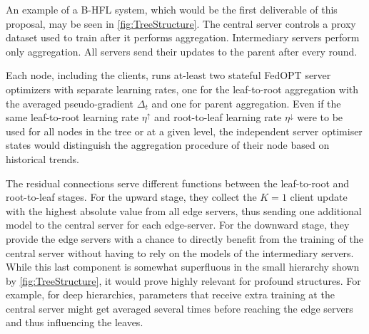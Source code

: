 An example of a B-HFL system, which would be the first deliverable of this proposal, may be seen in \cref{fig:TreeStructure}. The central server controls a proxy dataset used to train after it performs aggregation. Intermediary servers perform only aggregation. All servers send their updates to the parent after every round.

Each node, including the clients, runs at-least two stateful FedOPT server optimizers with separate learning rates, one for the leaf-to-root aggregation with the averaged pseudo-gradient $\Delta_t$ and one for parent aggregation. Even if the same leaf-to-root learning rate $\eta^\uparrow$ and root-to-leaf learning rate $\eta^\downarrow$ were to be used for all nodes in the tree or at a given level, the independent server optimiser states would distinguish the aggregation procedure of their node based on historical trends.

The residual connections serve different functions between the leaf-to-root and root-to-leaf stages. For the upward stage, they collect the $K=1$ client update with the highest absolute value from all edge servers, thus sending one additional model to the central server for each edge-server. For the downward stage, they provide the edge servers with a chance to directly benefit from the training of the central server without having to rely on the models of the intermediary servers. While this last component is somewhat superfluous in the small hierarchy shown by \cref{fig:TreeStructure}, it would prove highly relevant for profound structures. For example, for deep hierarchies, parameters that receive extra training at the central server might get averaged several times before reaching the edge servers and thus influencing the leaves.
